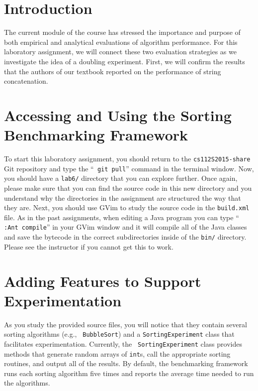 


\usepackage[compact]{titlesec}


\section*{Introduction}

The current module of the course has stressed the importance and purpose of both empirical and analytical evaluations of
algorithm performance. For this laboratory assignment, we will connect these two evaluation strategies as we investigate
the idea of a doubling experiment. First, we will confirm the results that the authors of our textbook reported on the
performance of string concatenation.

\section*{Accessing and Using the Sorting Benchmarking Framework}

To start this laboratory assignment, you should return to the {\tt cs112S2015-share} Git repository and type the ``{\tt
git pull}'' command in the terminal window.  Now, you should have a {\tt lab6/} directory that you can explore further.
Once again, please make sure that you can find the source code in this new directory and you understand why the
directories in the assignment are structured the way that they are. Next, you should use GVim to study the source code
in the {\tt build.xml} file.  As in the past assignments, when editing a Java program you can type ``{\tt
:Ant compile}'' in your GVim window and it will compile all of the Java classes and save the bytecode in the correct
subdirectories inside of the {\tt bin/} directory.  Please see the instructor if you cannot get this to work.

\section*{Adding Features to Support Experimentation}

As you study the provided source files, you will notice that they contain several sorting algorithms (e.g., {\tt
  BubbleSort}) and a {\tt SortingExperiment} class that facilitates experimentation. Currently, the {\tt
  SortingExperiment} class provides methods that generate random arrays of {\tt int}s, call the appropriate sorting
routines, and output all of the results.  By default, the benchmarking framework runs each sorting algorithm five times
and reports the average time needed to run the algorithms.

